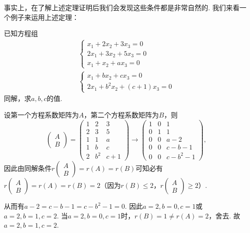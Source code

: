 事实上，在了解上述定理证明后我们会发现这些条件都是非常自然的. 我们来看一个例子来运用上述定理：
\begin{example}
    已知方程组\begin{gather*}
        \begin{cases}
            x_1+2x_2+3x_3=0  \\
            2x_1+3x_2+5x_3=0 \\
            x_1+x_2+ax_3=0
        \end{cases} \\
        \begin{cases}
            x_1+bx_2+cx_3=0 \\
            2x_1+b^2x_2+(c+1)x_3=0
        \end{cases}
    \end{gather*}
    同解，求$a,b,c$的值.
\end{example}
\begin{solution}
    设第一个方程系数矩阵为$A$，第二个方程系数矩阵为$B$，则
    \[\begin{pmatrix}
            A \\ B
        \end{pmatrix}=\begin{pmatrix}
            1 & 2 & 3 \\ 2 & 3 & 5 \\ 1 & 1 & a \\ 1 & b & c \\ 2 & b^2 & c+1
        \end{pmatrix}\to\begin{pmatrix}
            1 & 0 & 1 \\ 0 & 1 & 1 \\ 0 & 0 & a-2 \\ 0 & 0 & c-b-1 \\ 0 & 0 & c-b^2-1
        \end{pmatrix},\]
    因此由同解条件$r\begin{pmatrix}
            A \\ B
        \end{pmatrix}=r(A)=r(B)$可知必有$r\begin{pmatrix}
            A \\ B
        \end{pmatrix}=r(A)=r(B)=2$（因为$r(B)\leqslant 2$，$r\begin{pmatrix}
            A \\ B
        \end{pmatrix}\geqslant 2$）.

    从而有$a-2=c-b-1=c-b^2-1=0$. 因此$a=2,b=0,c=1$或$a=2,b=1,c=2$. 当$a=2,b=0,c=1$时，$r(B)=1\neq r(A)=2$，舍去. 故$a=2,b=1,c=2$.
\end{solution}

